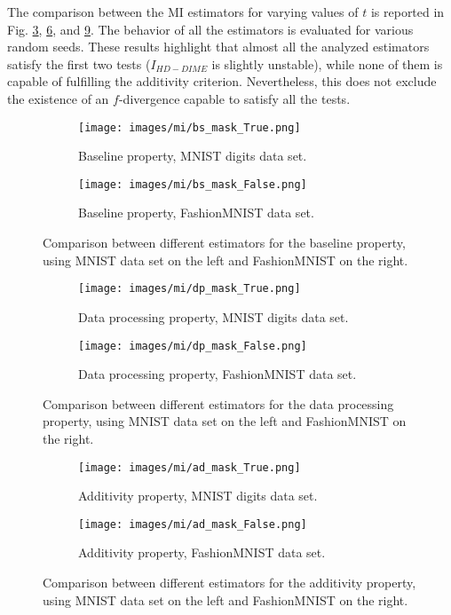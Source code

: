 The comparison between the MI estimators for varying values of $t$ is reported in Fig. \ref{fig:MI_baselines}, \ref{fig:MI_data processings}, and \ref{fig:MI_additivities}. The behavior of all the estimators is evaluated for various random seeds. These results highlight that almost all the analyzed estimators satisfy the first two tests ($I_{HD-DIME}$ is slightly unstable), while none of them is capable of fulfilling the additivity criterion. Nevertheless, this does not exclude the existence of an $f$-divergence capable to satisfy all the tests. 
\begin{figure}
\centering
\begin{subfigure}{.5\textwidth}
  \centering
  \texttt{[image: images/mi/bs\_mask\_True.png]}
  \caption{Baseline property, MNIST digits data set.}
  \label{fig:MI_baseline_digits}
\end{subfigure}%
\begin{subfigure}{.5\textwidth}
  \centering
  \texttt{[image: images/mi/bs\_mask\_False.png]}
  \caption{Baseline property, FashionMNIST data set.}
  \label{fig:MI_baseline_fashion}
\end{subfigure}
\caption{Comparison between different estimators for the baseline property, using MNIST data set on the left and FashionMNIST on the right.}
\label{fig:MI_baselines}
\end{figure}

\begin{figure}
\centering
\begin{subfigure}{.5\textwidth}
  \centering
  \texttt{[image: images/mi/dp\_mask\_True.png]}
  \caption{Data processing property, MNIST digits data set.}
  \label{fig:MI_data_processing_digits}
\end{subfigure}%
\begin{subfigure}{.5\textwidth}
  \centering
  \texttt{[image: images/mi/dp\_mask\_False.png]}
  \caption{Data processing property, FashionMNIST data set.}
  \label{fig:MI_data_processing_fashion}
\end{subfigure}
\caption{Comparison between different estimators for the data processing property, using MNIST data set on the left and FashionMNIST on the right.}
\label{fig:MI_data processings}
\end{figure}

\begin{figure}
\centering
\begin{subfigure}{.5\textwidth}
  \centering
  \texttt{[image: images/mi/ad\_mask\_True.png]}
  \caption{Additivity property, MNIST digits data set.}
  \label{fig:MI_additivity_digits}
\end{subfigure}%
\begin{subfigure}{.5\textwidth}
  \centering
  \texttt{[image: images/mi/ad\_mask\_False.png]}
  \caption{Additivity property, FashionMNIST data set.}
  \label{fig:MI_additivity_fashion}
\end{subfigure}
\caption{Comparison between different estimators for the additivity property, using MNIST data set on the left and FashionMNIST on the right.}
\label{fig:MI_additivities}
\end{figure}